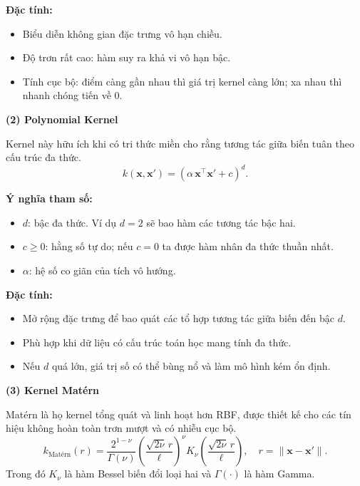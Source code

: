\textbf{Đặc tính:}
\begin{itemize} [labelsep=10pt, leftmargin=2cm]
    \item Biểu diễn không gian đặc trưng vô hạn chiều.
    \item Độ trơn rất cao: hàm suy ra khả vi vô hạn bậc.
    \item Tính cục bộ: điểm càng gần nhau thì giá trị kernel càng lớn; xa nhau thì nhanh chóng tiến về 0.
\end{itemize}

\textbf{(2) Polynomial Kernel}

Kernel này hữu ích khi có tri thức miền cho rằng tương tác giữa biến tuân theo cấu trúc đa thức.
\begin{equation}
    k(\mathbf{x},\mathbf{x}')=(\alpha\,\mathbf{x}^\top\mathbf{x}'+c)^d.
\end{equation}

\textbf{Ý nghĩa tham số:}
\begin{itemize} [labelsep=10pt, leftmargin=2cm]
    \item $d$: bậc đa thức. Ví dụ $d=2$ sẽ bao hàm các tương tác bậc hai.
    \item $c\ge 0$: hằng số tự do; nếu $c=0$ ta được hàm nhân đa thức thuần nhất.
    \item $\alpha$: hệ số co giãn của tích vô hướng.
\end{itemize}

\textbf{Đặc tính:}
\begin{itemize} [labelsep=10pt, leftmargin=2cm]
    \item Mở rộng đặc trưng để bao quát các tổ hợp tương tác giữa biến đến bậc $d$.
    \item Phù hợp khi dữ liệu có cấu trúc toán học mang tính đa thức.
    \item Nếu $d$ quá lớn, giá trị số có thể bùng nổ và làm mô hình kém ổn định.
\end{itemize}

\textbf{(3) Kernel Mat\'ern}

Mat\'ern là họ kernel tổng quát và linh hoạt hơn RBF, được thiết kế cho các tín hiệu không hoàn toàn trơn mượt và có nhiễu cục bộ.
\begin{equation}
    k_{\text{Mat\'ern}}(r)=\frac{2^{1-\nu}}{\Gamma(\nu)}\left(\frac{\sqrt{2\nu}\,r}{\ell}\right)^{\nu}K_{\nu}\!\left(\frac{\sqrt{2\nu}\,r}{\ell}\right),
    \quad r=\|\mathbf{x}-\mathbf{x}'\|.
\end{equation}
Trong đó $K_{\nu}$ là hàm Bessel biến đổi loại hai và $\Gamma(\cdot)$ là hàm Gamma.

